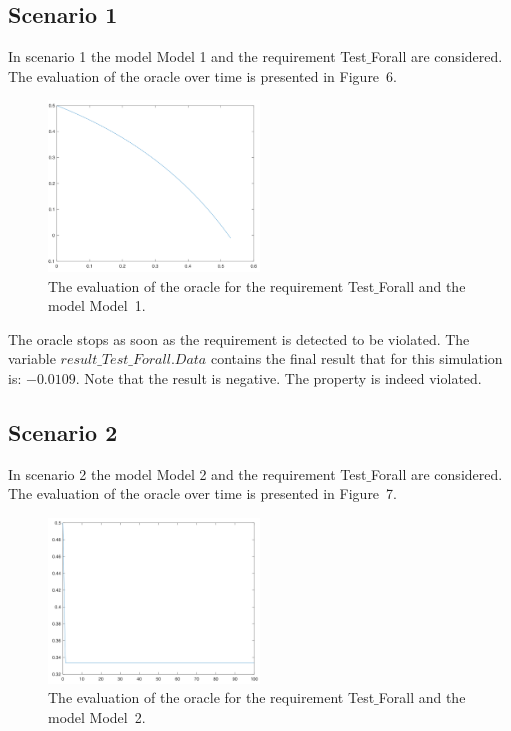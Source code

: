 \documentclass[12pt]{extarticle}
\newcommand{\<}{\langle}
\renewcommand{\>}{\rangle}
\theoremstyle{definition}
\begin{document}
\subsection{Scenario 1}
In scenario 1 the model Model 1 and the requirement Test$\_$Forall are considered. 
The evaluation of the oracle over time is presented in Figure~6.

\begin{figure}[h]
\caption{The evaluation of the oracle for the requirement Test$\_$Forall  and the model Model~1.}
  \centering
    \includegraphics[width=0.5\textwidth]{Manual/resModel1TestForall.png}
\end{figure}


The oracle stops as soon as the requirement is detected to be violated.
The variable  $result\_Test\_Forall.Data$  contains the final result that for this simulation is: $-0.0109$.
Note that the result is negative. 
The property is indeed violated.

\subsection{Scenario 2}
In scenario 2 the model Model 2 and the requirement Test$\_$Forall are considered. 
The evaluation of the oracle over time is presented in Figure~7.

\begin{figure}[h]
\caption{The evaluation of the oracle for the requirement Test$\_$Forall  and the model Model~2.}
  \centering
    \includegraphics[width=0.5\textwidth]{Manual/resModel2TestForall.png}
\end{figure}
\end{document}
